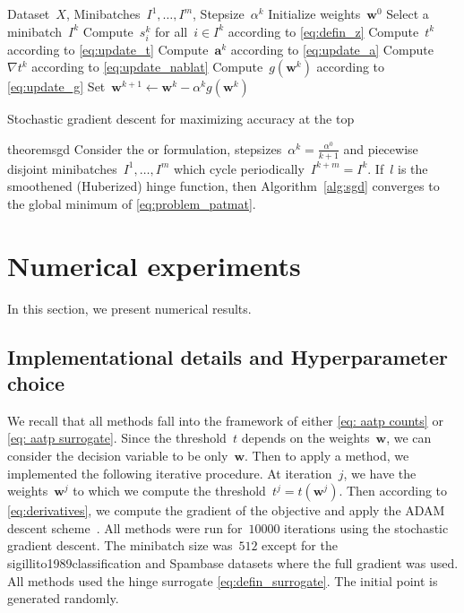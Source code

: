 \begin{algorithm}[!ht]
  \begin{algorithmic}[1]
    \Require Dataset~$X$, Minibatches~$I^1,\dots,I^m$, Stepsize~$\alpha^k$
    \State Initialize weights~$\bm{w}^0$
    \State Select a minibatch~$I^k$
    \State Compute~$s_i^k$ for all~$i\in I^k$ according to \eqref{eq:defin_z}
    \State Compute~$t^k$ according to \eqref{eq:update_t}
    \State Compute~$\bm{a}^k$ according to \eqref{eq:update_a}
    \State Compute~$\nabla t^k$ according to \eqref{eq:update_nablat}
    \State Compute~$g(\bm{w}^k)$ according to \eqref{eq:update_g}
    \State Set~$\bm{w}^{k+1}\gets \bm{w}^k - \alpha^k g(\bm{w}^k)$
    \EndFor
  \end{algorithmic}
  \caption{Stochastic gradient descent for maximizing accuracy at the top}
  \label{alg:sgd}
\end{algorithm}

\begin{restatable}{theorem}{sgd}\label{thm:sgd}
  Consider the \PatMat or \PatMatNP formulation, stepsizes~$\alpha^k = \frac{\alpha^0}{k+1}$ and piecewise disjoint minibatches~$I^1,\dots,I^m$ which cycle periodically~$I^{k+m}=I^k$. If~$l$ is the smoothened (Huberized) hinge function, then Algorithm~\ref{alg:sgd} converges to the global minimum of \eqref{eq:problem_patmat}.  
\end{restatable}

\section{Numerical experiments}\label{sec:num1}

In this section, we present numerical results.

\subsection{Implementational details and Hyperparameter choice}

We recall that all methods fall into the framework of either \eqref{eq: aatp counts} or \eqref{eq: aatp surrogate}. Since the threshold~$t$ depends on the weights~$\bm{w}$, we can consider the decision variable to be only~$\bm{w}$. Then to apply a method, we implemented the following iterative procedure. At iteration~$j$, we have the weights~$\bm{w}^j$ to which we compute the threshold~$t^j=t(\bm{w}^j)$. Then according to \eqref{eq:derivatives}, we compute the gradient of the objective and apply the ADAM descent scheme~\cite{kingma2014adam}. All methods were run for~$10000$ iterations using the stochastic gradient descent. The minibatch size was~$512$ except for the sigillito1989classification and Spambase datasets where the full gradient was used. All methods used the hinge surrogate \eqref{eq:defin_surrogate}. The initial point is generated randomly.

